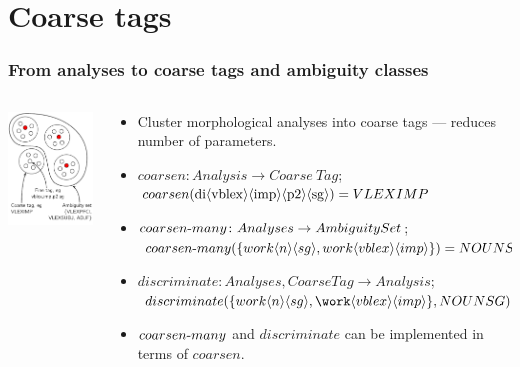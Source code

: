 \documentclass{beamer}
\newcommand{\mtag}[1]{%
\mathchardef\mhyphen="2D %
\ensuremath{\langle{}#1\rangle{}}}
\begin{document}
\section{Coarse tags}
\begin{frame}
\frametitle{From analyses to coarse tags and ambiguity classes}
\begin{columns}
  \begin{column}{4cm}
    \includegraphics[width=4.5cm]{fine-coarse-ambgsets.pdf}
  \end{column}
  \begin{column}{8cm}
    \begin{itemize}

      \item Cluster morphological analyses into coarse tags --- reduces number
        of parameters.

      \item $coarsen \colon Analysis \rightarrow Coarse\ Tag$;\\
        $coarsen(\mathrm{di\mtag{vblex}\mtag{imp}\mtag{p2}\mtag{sg}})\linebreak = VLEXIMP$

      \item $coarsen\hbox{-}many \colon Analyses \rightarrow Ambiguity Set$;\\
        $coarsen\hbox{-}many(\allowbreak{}\{
          work\mtag{n}\mtag{sg},
          work\mtag{vblex}\mtag{imp}\})\linebreak = NOUNSG, VBLEXIMP$\\

      \item $discriminate \colon Analyses, Coarse Tag \rightarrow Analysis $;
        $discriminate(\{work\mtag{n}\mtag{sg},\allowbreak\work\mtag{vblex}\mtag{imp}\}, NOUNSG) = work\mtag{n}\mtag{sg}$\\

      \item $coarsen\hbox{-}many$ and $discriminate$ can be implemented in terms of $coarsen$.

    \end{itemize}
  \end{column}
\end{columns}
\end{frame}
\end{document}
